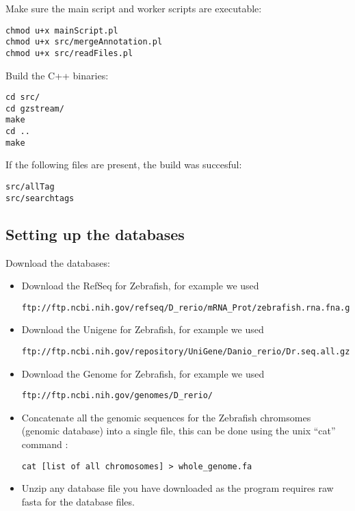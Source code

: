 \documentclass[a4paper,12pt]{article}
\begin{document}
Make sure the main script and worker scripts are executable:
\small{
\begin{verbatim}
chmod u+x mainScript.pl
chmod u+x src/mergeAnnotation.pl
chmod u+x src/readFiles.pl
\end{verbatim}
}

Build the C++ binaries:
\small{
\begin{verbatim}
cd src/
cd gzstream/
make 
cd ..
make
\end{verbatim}
}

If the following files are present, the build was succesful: 
\small{
\begin{verbatim}
src/allTag
src/searchtags
\end{verbatim}
}

\subsection{Setting up the databases}
\label{sec:database}
Download the databases:

\begin{itemize}
\item Download the RefSeq for Zebrafish, for example we used 
\small{
\begin{verbatim}
ftp://ftp.ncbi.nih.gov/refseq/D_rerio/mRNA_Prot/zebrafish.rna.fna.gz
\end{verbatim}
}
\item Download the Unigene for Zebrafish, for example we used 
\small{
\begin{verbatim}
ftp://ftp.ncbi.nih.gov/repository/UniGene/Danio_rerio/Dr.seq.all.gz
\end{verbatim}
}

\item Download the Genome for Zebrafish, for example we used
\small{
\begin{verbatim}
ftp://ftp.ncbi.nih.gov/genomes/D_rerio/
\end{verbatim}
}
\item Concatenate all the genomic sequences for the Zebrafish chromsomes (genomic database) into a single file, this can be done using the unix ``cat'' command :
\small{
\begin{verbatim}
cat [list of all chromosomes] > whole_genome.fa
\end{verbatim}
}
\item Unzip any database file you have downloaded as the program requires raw fasta for the database files.
\end{itemize}
\end{document}
